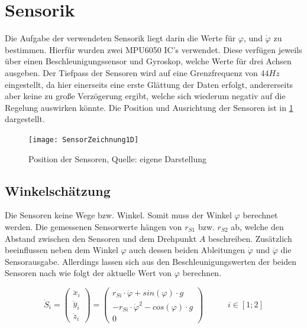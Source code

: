 \section{Sensorik}
\label{Sensorik_secd}
Die Aufgabe der verwendeten Sensorik liegt darin die Werte für $\varphi$, und $\dot{\varphi}$ zu bestimmen. Hierfür wurden zwei MPU6050 IC's verwendet. Diese verfügen jeweils über einen Beschleunigungssensor und Gyroskop, welche Werte für drei Achsen ausgeben. Der Tiefpass der Sensoren wird auf eine Grenzfrequenz von $44Hz$ eingestellt, da hier einerseits eine erste Glättung der Daten erfolgt, andererseits aber keine zu große Verzögerung ergibt, welche sich wiederum negativ auf die Regelung auswirken könnte. Die Position und Ausrichtung der Sensoren ist in \ref{Position_Sensoren_pic} dargestellt.

\begin{figure}[h]
\texttt{[image: SensorZeichnung1D]}
\caption{Position der Sensoren, Quelle: eigene Darstellung}

\label{Position_Sensoren_pic}
\end{figure}

\subsection{Winkelschätzung}
Die Sensoren keine Wege bzw. Winkel. Somit muss der Winkel $\varphi$ berechnet werden. Die gemessenen Sensorwerte hängen von $r_{S1}$ bzw. $r_{S2}$ ab, welche den Abstand zwischen den Sensoren und dem Drehpunkt $A$ beschreiben. Zusätzlich beeinflussen neben dem Winkel $\varphi$ auch dessen beiden Ableitungen $\dot{\varphi}$ und $\ddot{\varphi}$ die Sensorausgabe. Allerdings lassen sich aus den Beschleunigungswerten der beiden Sensoren nach \cite{Cubli1D} wie folgt der aktuelle Wert von $\varphi$ berechnen.

\begin{equation}
\ddot{S}_i = 
\begin{pmatrix}
\ddot{x}_i \\ \ddot{y}_i \\ \ddot{z}_i
\end{pmatrix} =
\begin{pmatrix}
r_{Si} \cdot \ddot{\varphi} + sin(\varphi) \cdot g \\
- r_{Si} \cdot \dot{\varphi}^2 - cos(\varphi) \cdot g \\
0
\end{pmatrix}
\hspace{35pt}
i \in [1;2]
\end{equation}

